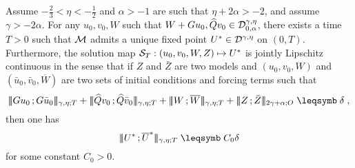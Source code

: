 \documentclass[reqno,11pt]{article}
\def\seminormff#1#2{|\!|\!|#1\,\mathord{;}\,#2|\!|\!|}
\begin{document}
\begin{prop}
\label{prop:fixed_point}
Assume $-\frac23 < \eta < -\frac12$ and $\alpha > -1$ are such that
$\eta+2\alpha > -2$, and assume $\gamma > -2\alpha$.  
%
For any $u_0, v_0, W$ such that $W+Gu_0, \widehat
Qv_0\in{\mathcal D}^{\gamma,\eta}_{0,\alpha}$, there exists a time $T>0$ such that ${\mathcal M}$
admits a unique fixed point
$U^*\in{\mathcal D}^{\gamma,\eta}$ on $(0,T)$.
Furthermore, the solution map ${\mathcal S}_T:(u_0,v_0,W,Z) \mapsto U^*$ is
jointly Lipschitz continuous in the sense that if $Z$ and $\bar Z$ are two
models and $(u_0,v_0,W)$ and $(\bar u_0,\bar v_0,\overline W)$ are two sets of
initial conditions and forcing terms such that 
\begin{equation}
 \label{eq:prop_fixed_point01}
 \seminormff{Gu_0}{G\bar u_0}_{\gamma,\eta; T} +  
 \seminormff{\widehat Q v_0}{\widehat Q \bar v_0}_{\gamma,\eta; T} + 
 \seminormff{W}{\overline W}_{\gamma,\eta;T} + 
 \seminormff{Z}{\bar Z}_{2\gamma+\alpha;O} \leqs \delta\;,
\end{equation} 
then one has
\begin{equation}
 \label{eq:prop_fixed_point02}
 \seminormff{U^*}{\overline U^*}_{\gamma,\eta;T} 
 \leqs C_0 \delta
\end{equation} 
for some constant $C_0>0$. 
\end{prop}
%
\end{document}
